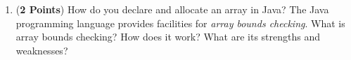 \documentclass[12pt]{article}
\begin{document}
\begin{enumerate}
\begin{enumerate}


\item ({\bf 2 Points}) How do you declare and allocate an array in Java?  The Java programming language provides
facilities for {\em array bounds checking}.  What is array bounds checking? How does it work? What are its strengths and
weaknesses?

\end{enumerate}

\newpage






\end{enumerate}
\end{document}
